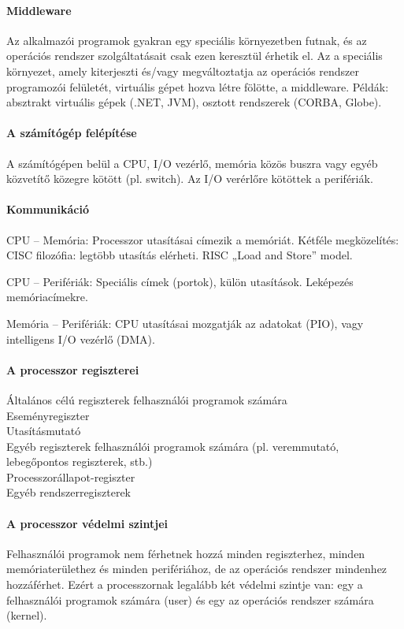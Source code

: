 \documentclass[fleqn,10pt,a4paper]{article}
\theoremstyle{magyar}
\begin{document}
  \paragraph{Middleware}
  Az alkalmazói programok gyakran egy speciális környezetben futnak, és az operációs rendszer szolgáltatásait csak ezen
  keresztül érhetik el. Az a speciális környezet, amely kiterjeszti és/vagy megváltoztatja az operációs rendszer
  programozói felületét, virtuális gépet hozva létre fölötte, a middleware. Példák: absztrakt virtuális gépek (.NET,
  JVM), osztott rendszerek (CORBA, Globe).

  \paragraph{A számítógép felépítése} A számítógépen belül a CPU, I/O vezérlő, memória közös buszra vagy egyéb
  közvetítő közegre kötött (pl. switch). Az I/O verérlőre kötöttek a perifériák.


  \paragraph{Kommunikáció}
  CPU – Memória: Processzor utasításai címezik a memóriát. Kétféle megközelítés: CISC filozófia: legtöbb utasítás
  elérheti. RISC „Load and Store” model.
  
  CPU – Perifériák:  Speciális címek (portok), külön utasítások. Leképezés memóriacímekre.

  Memória – Perifériák: CPU utasításai mozgatják az adatokat (PIO), vagy intelligens I/O vezérlő (DMA).

  \paragraph{A processzor regiszterei} Általános célú regiszterek felhasználói programok számára\\
  Eseményregiszter\\
  Utasításmutató \\
  Egyéb regiszterek felhasználói programok számára (pl. veremmutató, lebegőpontos regiszterek, stb.)\\
  Processzorállapot-regiszter\\
  Egyéb rendszerregiszterek\

  \paragraph{A processzor védelmi szintjei}
  Felhasználói programok nem férhetnek hozzá minden regiszterhez, minden memóriaterülethez és minden perifériához, de az
  operációs rendszer mindenhez hozzáférhet. Ezért a processzornak legalább két védelmi szintje van: egy a felhasználói
  programok számára (user) és egy az operációs rendszer számára (kernel).
\end{document}

